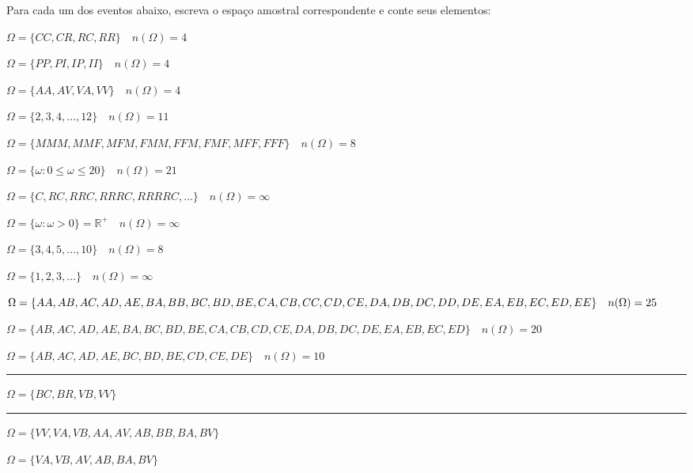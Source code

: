 \documentclass[a4paper,11pt,fleqn]{article}\usepackage[]{graphicx}\usepackage[]{color}
\theoremstyle{definition}
\begin{document}
\begin{compactenum} %
\item Para cada um dos eventos abaixo, escreva o espaço amostral
  correspondente e conte seus elementos:
  \begin{compactenum}
  \item $\Omega = \{CC, CR, RC, RR\} \quad n(\Omega) = 4$
  \item $\Omega = \{PP, PI, IP, II\} \quad n(\Omega) = 4$
  \item $\Omega = \{AA, AV, VA, VV\} \quad n(\Omega) = 4$
  \item $\Omega = \{2, 3, 4, \ldots, 12\} \quad n(\Omega) = 11$
  \item $\Omega = \{MMM, MMF, MFM, FMM, FFM, FMF, MFF, FFF\} \quad
  n(\Omega) = 8$
  \item $\Omega = \{\omega : 0 \leq \omega \leq 20 \} \quad n(\Omega) =
  21$
  \item $\Omega = \{C, RC, RRC, RRRC, RRRRC, \ldots\} \quad n(\Omega) =
    \infty$
  \item $\Omega = \{\omega : \omega > 0 \} = \mathbb{R}^{+} \quad
    n(\Omega) = \infty$
  \item $\Omega = \{3, 4, 5, \ldots, 10\} \quad n(\Omega) = 8$
  \item $\Omega = \{1, 2, 3, \ldots\} \quad n(\Omega) = \infty$
  \item $\Omega = \{AA, AB, AC, AD, AE, BA, BB, BC, BD, BE, CA, CB, CC,
    CD, CE, DA, DB, DC, DD, DE, \\ EA, EB, EC, ED, EE\} \quad n(\Omega) =
    25$
  \item $\Omega = \{AB, AC, AD, AE, BA, BC, BD, BE, CA, CB,
    CD, CE, DA, DB, DC, DE, EA, EB, EC, ED\} \quad n(\Omega) =
    20$
  \item $\Omega = \{AB, AC, AD, AE, BC, BD, BE,
    CD, CE, DE\} \quad n(\Omega) = 10$
  \end{compactenum}

\vspace{0.3cm}
\hrule
\vspace{0.3cm}

\item $\Omega = \{BC, BR, VB, VV\}$

\vspace{0.3cm}
\hrule
\vspace{0.3cm}

\item
  \begin{compactenum}
  \item $\Omega = \{VV, VA, VB, AA, AV, AB, BB, BA, BV\}$
  \item $\Omega = \{VA, VB, AV, AB, BA, BV\}$
  \end{compactenum}


\end{compactenum}
\end{document}
